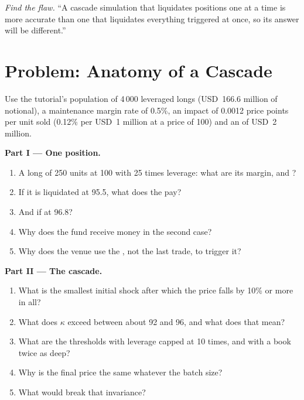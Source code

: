 \begin{exercise}[$\star\star\star$]\label{exo:m3:margin-liquidation-and-loss-allocation:8}
\emph{Find the flaw.} ``A cascade simulation that liquidates positions one at a time is more accurate than one that
liquidates everything triggered at once, so its answer will be different.''
\end{exercise}

\section{Problem: Anatomy of a Cascade}

\begin{problem}\label{pb:m3:margin-liquidation-and-loss-allocation:1}
Use the tutorial's population of 4\,000 leveraged longs (USD~166.6 million of notional), a maintenance margin rate of 0.5\%,
an impact of 0.0012 price points per unit sold (0.12\% per USD~1 million at a price of 100) and an  of USD~2
million.

\medskip\noindent\textbf{Part I --- One position.}
\begin{enumerate}
\item A long of 250 units at 100 with 25 times leverage: what are its margin,  and ?
\item If it is liquidated at 95.5, what does the  pay?
\item And if at 96.8?
\item Why does the fund receive money in the second case?
\item Why does the venue use the , not the last trade, to trigger it?
\end{enumerate}

\medskip\noindent\textbf{Part II --- The cascade.}
\begin{enumerate}[resume]
\item What is the smallest initial shock after which the price falls by 10\% or more in all?
\item What does $\kappa$ exceed between about 92 and 96, and what does that mean?
\item What are the thresholds with leverage capped at 10 times, and with a book twice as deep?
\item Why is the final price the same whatever the batch size?
\item What would break that invariance?
\end{enumerate}


\end{problem}
